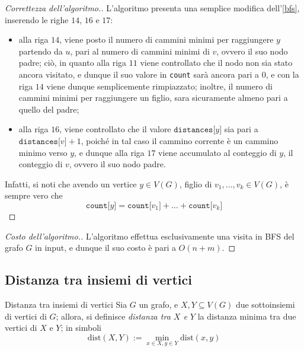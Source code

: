 \documentclass[a4paper, 12pt]{report}
\begin{document}
    \begin{proof}[Correttezza dell'algoritmo.]
        L'algoritmo presenta una semplice modifica dell'\cref{bfs}, inserendo le righe $14$, $16$ e $17$:

        \begin{itemize}
            \item alla riga $14$, viene posto il numero di cammini minimi per raggiungere $y$ partendo da $u$, pari al numero di cammini minimi di $v$, ovvero il suo nodo padre; ciò, in quanto alla riga $11$ viene controllato che il nodo non sia stato ancora visitato, e dunque il suo valore in \texttt{count} sarà ancora pari a $0$, e con la riga $14$ viene dunque semplicemente rimpiazzato; inoltre, il numero di cammini minimi per raggiungere un figlio, sara sicuramente almeno pari a quello del padre;
            \item alla riga $16$, viene controllato che il valore $\texttt{distances[}y\texttt{]}$ sia pari a $\texttt{distances[}v\texttt{]} + 1$, poiché in tal caso il cammino corrente è un cammino minimo verso $y$, e dunque alla riga $17$ viene accumulato al conteggio di $y$, il conteggio di $v$, ovvero il suo nodo padre.
        \end{itemize}

        Infatti, si noti che avendo un vertice $y \in V(G)$, figlio di $v_1, \ldots, v_k \in V(G)$, è sempre vero che $$\texttt{count[}y\texttt{]} = \texttt{count[}v_1\texttt{]} + \ldots + \texttt{count[}v_k\texttt{]}$$
    \end{proof}

    \begin{proof}[Costo dell'algoritmo.]
        L'algoritmo effettua esclusivamente una visita in BFS del grafo $G$ in input, e dunque il suo costo è pari a $O(n+m)$.
    \end{proof}

    \subsection{Distanza tra insiemi di vertici}

    \begin{frameddefn}{Distanza tra insiemi di vertici}
        Sia $G$ un grafo, e $X, Y \subseteq V(G)$ due sottoinsiemi di vertici di $G$; allora, si definisce \textit{distanza tra $X$ e $Y$} la distanza minima tra due vertici di $X$ e $Y$; in simboli $$\mathrm{dist}(X, Y) := \min_{x \in X, y \in Y}{\mathrm{dist}(x, y)}$$
    \end{frameddefn}
\end{document}
